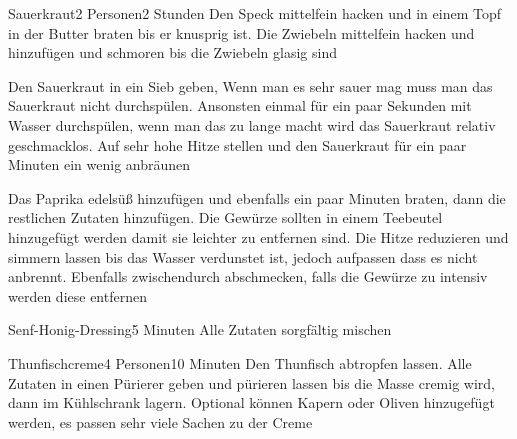 
\begin{recipe}{Sauerkraut}{2 Personen}{2 Stunden}
Den Speck mittelfein hacken und in einem Topf in der Butter braten bis er knusprig ist. Die Zwiebeln mittelfein hacken und hinzufügen und schmoren bis die Zwiebeln glasig sind

Den Sauerkraut in ein Sieb geben, Wenn man es sehr sauer mag muss man das Sauerkraut nicht durchspülen.
Ansonsten einmal für ein paar Sekunden mit Wasser durchspülen, wenn man das zu lange macht wird das Sauerkraut relativ geschmacklos. Auf sehr hohe Hitze stellen und den Sauerkraut für ein paar Minuten ein wenig anbräunen

Das Paprika edelsüß hinzufügen und ebenfalls ein paar Minuten braten, dann die restlichen Zutaten hinzufügen. Die Gewürze sollten in einem Teebeutel hinzugefügt werden damit sie leichter zu entfernen sind. Die Hitze reduzieren und simmern lassen bis das Wasser verdunstet ist, jedoch aufpassen dass es nicht anbrennt. Ebenfalls zwischendurch abschmecken, falls die Gewürze zu intensiv werden diese entfernen
\end{recipe}


\begin{recipe}{Senf-Honig-Dressing}{}{5 Minuten}
Alle Zutaten sorgfältig mischen
\end{recipe}


\begin{recipe}{Thunfischcreme}{4 Personen}{10 Minuten}
Den Thunfisch abtropfen lassen.
Alle Zutaten in einen Pürierer geben und pürieren lassen bis die Masse cremig wird, dann im Kühlschrank lagern.
Optional können Kapern oder Oliven hinzugefügt werden, es passen sehr viele Sachen zu der Creme
\end{recipe} 

